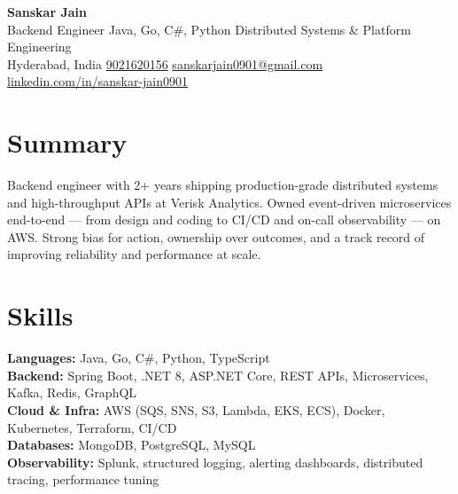 \documentclass[10pt,letterpaper]{article}
\begin{document}
\begin{center}
    {\Large \textbf{Sanskar Jain}} \\[2pt]
    Backend Engineer \textbar{} Java, Go, C\#, Python \textbar{} Distributed Systems \& Platform Engineering \\[2pt]
    Hyderabad, India \enspace\textbar\enspace
    \href{tel:9021620156}{9021620156} \enspace\textbar\enspace
    \href{mailto:sanskarjain0901@gmail.com}{sanskarjain0901@gmail.com} \enspace\textbar\enspace
    \href{https://www.linkedin.com/in/sanskar-jain0901/}{linkedin.com/in/sanskar-jain0901}
\end{center}

\section*{Summary}
Backend engineer with 2+ years shipping production-grade distributed systems and high-throughput APIs at Verisk Analytics.
Owned event-driven microservices end-to-end --- from design and coding to CI/CD and on-call observability --- on AWS.
Strong bias for action, ownership over outcomes, and a track record of improving reliability and performance at scale.

\section*{Skills}
\textbf{Languages:} Java, Go, C\#, Python, TypeScript \\
\textbf{Backend:} Spring Boot, .NET 8, ASP.NET Core, REST APIs, Microservices, Kafka, Redis, GraphQL \\
\textbf{Cloud \& Infra:} AWS (SQS, SNS, S3, Lambda, EKS, ECS), Docker, Kubernetes, Terraform, CI/CD \\
\textbf{Databases:} MongoDB, PostgreSQL, MySQL \\
\textbf{Observability:} Splunk, structured logging, alerting dashboards, distributed tracing, performance tuning

\end{document}
